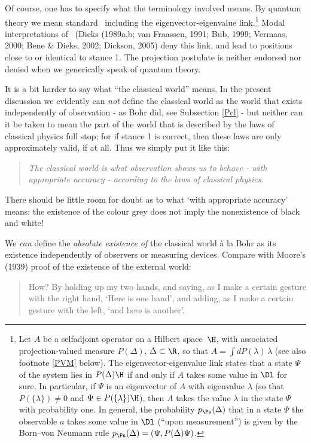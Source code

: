 \documentclass[12pt,titlepage]{article}
\newcommand{\Hs}{Hilbert space} \newcommand{\Bs}{Banach space}
\newcommand{\lm}{\lambda} \newcommand{\Lm}{\Lambda}
\begin{document}
Of course, one has to specify what the terminology involved means. By quantum theory we mean standard \qm\  including the eigenvector-eigenvalue link.\footnote{Let $A$ be a selfadjoint operator on a \Hs\ $\H$, with associated
projection-valued measure $P(\Delta)$, $\Delta\subset \R$, so that $A=\int dP(\lm)\, \lm$ (see also footnote  \ref{PVM} below). The eigenvector-eigenvalue link states that a state $\Psi$ of the system lies in $P(\Delta)\H$ if and only if $A$ takes some value in $\Dl$ for sure. In particular, if $\Psi$ is an eigenvector of $A$ with eigenvalue $\lm$ (so that $P(\{\lm\})\neq 0$ and $\Psi\in P(\{\lm\})\H$), then $A$ takes the value $\lm$ in the state $\Psi$ with probability one. In general, the probability $p_{\Ps}(\Delta)$ that
in a state $\Psi$ the observable $a$ takes some value in $\Dl$ (``upon measurement'') is given by the Born--von Neumann  rule $p_{\Ps}(\Delta)=(\Psi, P(\Delta)\Psi)$.} 
Modal interpretations of \qm\ (Dieks (1989a,b; van Fraassen, 1991; Bub, 1999; Vermaas, 2000; Bene \& Dieks, 2002; Dickson, 2005) deny this link, and lead to positions  close to or identical to stance 1.
 The projection postulate is neither endorsed nor denied when we generically speak of quantum theory.

 It is a bit harder to say what ``the classical world'' means. In the present discussion we evidently  can {\it not}  define the classical world as the world that exists independently of observation - as Bohr did, see Subsection \ref{Pcl} - but neither can it be taken to mean the
part of the world that is described by the laws of classical physics full stop; for if stance 1 is correct, then  these laws are only approximately valid, if at all. Thus we simply put it like this: 
\begin{quote}{\it The classical world is what observation shows us to behave - with appropriate accuracy - according to the laws of classical physics}.
\end{quote}
There should be little room for doubt as to what `with appropriate accuracy' means: the existence of the colour grey does not imply the nonexistence of black and white!

We {\it can} define the {\it absolute existence of}  the classical world \`{a} la Bohr as its existence  independently of observers or measuring devices. Compare with Moore's (1939)  proof of the existence of the external world:
\begin{quote} 
How? By holding up my two hands, and saying, as I make a certain gesture with the right hand, `Here is one hand', and adding, as I make a certain gesture with the left, `and here is another'.\end{quote}
\end{document}
